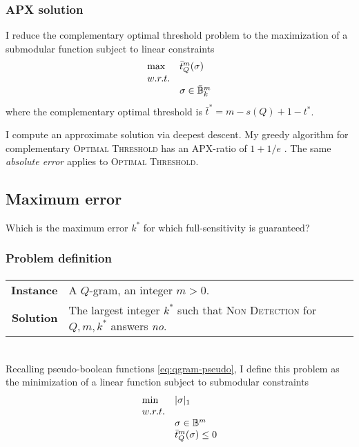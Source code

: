 \subsubsection{APX solution}

I reduce the complementary optimal threshold problem to the maximization of a submodular function subject to linear constraints
\begin{equation}
\begin{array}{ll}
\text{max} & \bar{t}_{Q}^{m}(\sigma)		\\
w.r.t.								\\
& \sigma \in \bar{\mathbb {B}}^m_k			\\
\end{array}
\end{equation}
where the complementary optimal threshold is $\bar{t}^* = m - s(Q) + 1 - t^*$.

I compute an approximate solution via deepest descent.
My greedy algorithm for complementary \textsc{Optimal Threshold} has an APX-ratio of $1 + 1/e$ \citep{Vazirani2001}.
The same \emph{absolute error} applies to \textsc{Optimal Threshold}.

\subsection{Maximum error}

Which is the maximum error $k^*$ for which full-sensitivity is guaranteed?

\subsubsection{Problem definition}

\paragraph{}
\begin{tabular}{rl}
{\bf Instance}	&	A $Q$-gram, an integer $m > 0$.\\
{\bf Solution}	&	The largest integer $k^*$ such that \textsc{Non Detection} for $Q,m,k^*$ answers \emph{no}.\\
\end{tabular}
\\

Recalling pseudo-boolean functions \ref{eq:qgram-pseudo}, I define this problem as the minimization of a linear function subject to submodular constraints
\begin{equation}
\begin{array}{ll}
\text{min} & |\sigma|_1			\\
w.r.t.								\\
& \sigma \in \mathbb {B}^m					\\
& \bar{t}_{Q}^{m}(\sigma) \leq 0	\\
\end{array}
\end{equation}

